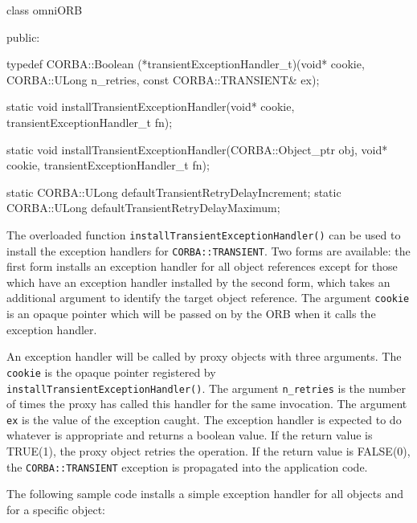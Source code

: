 \documentclass[11pt,twoside,a4paper]{book}
\newcommand{\code}[1]{\texttt{#1}}
\newcommand{\op}[1]{\texttt{#1()}}
\begin{document}
\begin{cxxlisting}
class omniORB {
public:
  
typedef CORBA::Boolean (*transientExceptionHandler_t)(void* cookie,
                                                CORBA::ULong n_retries,
                                                const CORBA::TRANSIENT& ex);

static void installTransientExceptionHandler(void* cookie,
                                             transientExceptionHandler_t fn);

static void installTransientExceptionHandler(CORBA::Object_ptr obj,
                                             void* cookie,
                                             transientExceptionHandler_t fn);
  
static CORBA::ULong defaultTransientRetryDelayIncrement;
static CORBA::ULong defaultTransientRetryDelayMaximum;
}
\end{cxxlisting}

The overloaded function \op{installTransientExceptionHandler} can be
used to install the exception handlers for \code{CORBA::TRANSIENT}.
Two forms are available: the first form installs an exception handler
for all object references except for those which have an exception
handler installed by the second form, which takes an additional
argument to identify the target object reference. The argument
\code{cookie} is an opaque pointer which will be passed on by the ORB
when it calls the exception handler.

An exception handler will be called by proxy objects with three
arguments. The \code{cookie} is the opaque pointer registered by
\op{installTransientExceptionHandler}. The argument \code{n\_retries}
is the number of times the proxy has called this handler for the same
invocation. The argument \code{ex} is the value of the exception
caught.  The exception handler is expected to do whatever is
appropriate and returns a boolean value. If the return value is
TRUE(1), the proxy object retries the operation. If the return value
is FALSE(0), the \code{CORBA::TRANSIENT} exception is propagated into
the application code.

The following sample code installs a simple exception handler for all
objects and for a specific object:
\end{document}
